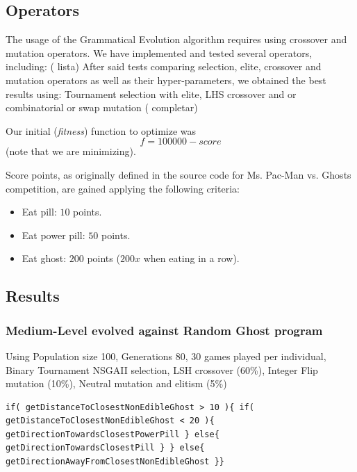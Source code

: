 \documentclass{llncs}
\newcommand{\pacman}{Ms. Pac-Man vs. Ghosts }
\begin{document}
\subsection{Operators}
The usage of the Grammatical Evolution algorithm requires using crossover and mutation operators. We have implemented and tested several operators, including: ({\color{red} lista})
After said tests comparing selection, elite, crossover and mutation operators as well as their hyper-parameters, we obtained the best results using: Tournament selection with elite, LHS crossover and or combinatorial or swap mutation ({\color{red} completar})

\hfill

Our initial (\textit{fitness}) function to optimize was
\begin{equation} %
f = 100000 - score
\end{equation}
(note that we are minimizing).

Score points, as originally defined in the source code for \pacman competition, are gained applying the following criteria:
\begin{itemize}
\label{vanilla_pacman_score}
\item Eat pill: $10$ points.
\item Eat power pill: $50$ points.
\item Eat ghost: $200$ points ($200x$ when eating in a row).
\end{itemize}

\subsection{Results}

\subsubsection{Medium-Level evolved against Random Ghost program} Using Population size 100, Generations 80, 30 games played per individual, Binary Tournament NSGAII selection, LSH crossover (60\%), Integer Flip mutation (10\%), Neutral mutation and elitism (5\%)

\begin{lstlisting}[frame=single, caption=caption, breaklines=true]
if( getDistanceToClosestNonEdibleGhost > 10 ){ if( getDistanceToClosestNonEdibleGhost < 20 ){ getDirectionTowardsClosestPowerPill } else{ getDirectionTowardsClosestPill } } else{ getDirectionAwayFromClosestNonEdibleGhost }}
\end{lstlisting} %
\end{document}
